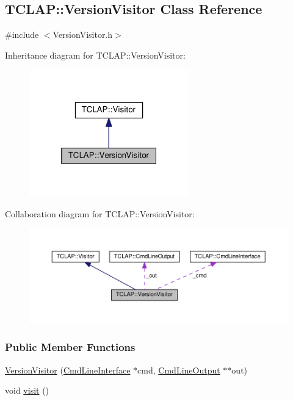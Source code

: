 \hypertarget{classTCLAP_1_1VersionVisitor}{}\subsection{T\+C\+L\+AP\+:\+:Version\+Visitor Class Reference}
\label{classTCLAP_1_1VersionVisitor}


{\ttfamily \#include $<$Version\+Visitor.\+h$>$}



Inheritance diagram for T\+C\+L\+AP\+:\+:Version\+Visitor\+:
\nopagebreak
\begin{figure}[H]
\begin{center}
\leavevmode
\includegraphics[width=196pt]{classTCLAP_1_1VersionVisitor__inherit__graph}
\end{center}
\end{figure}


Collaboration diagram for T\+C\+L\+AP\+:\+:Version\+Visitor\+:
\nopagebreak
\begin{figure}[H]
\begin{center}
\leavevmode
\includegraphics[width=350pt]{classTCLAP_1_1VersionVisitor__coll__graph}
\end{center}
\end{figure}
\subsubsection*{Public Member Functions}
\begin{DoxyCompactItemize}
\item 
\hyperlink{classTCLAP_1_1VersionVisitor_a6e5c16f245e2333dcc568dc9c4e6d537}{Version\+Visitor} (\hyperlink{classTCLAP_1_1CmdLineInterface}{Cmd\+Line\+Interface} $\ast$cmd, \hyperlink{classTCLAP_1_1CmdLineOutput}{Cmd\+Line\+Output} $\ast$$\ast$out)
\item 
void \hyperlink{classTCLAP_1_1VersionVisitor_a30b0d5bd22ac41364d027b94bded4fc0}{visit} ()
\end{DoxyCompactItemize}
